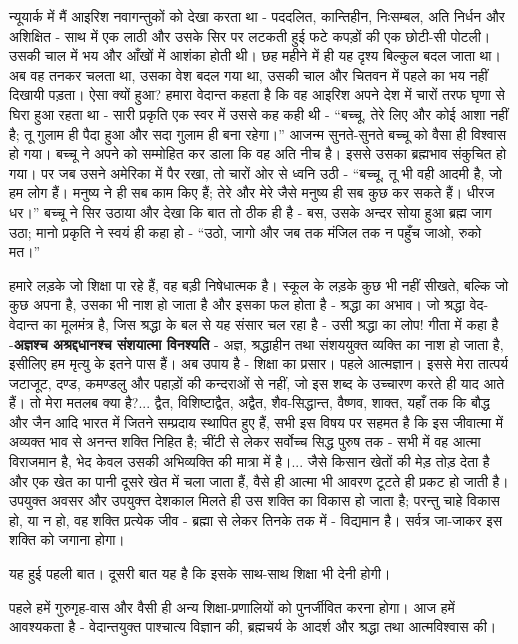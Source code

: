 न्यूयार्क में मैं आइरिश नवागन्तुकों को देखा करता था - पददलित, कान्तिहीन, निःसम्बल, अति निर्धन और अशिक्षित - साथ में एक लाठी और उसके सिर पर लटकती हुई फटे कपड़ों की एक छोटी-सी पोटली। उसकी चाल में भय और आँखों में आशंका होती थी। छह महीने में ही यह दृश्य बिल्कुल बदल जाता था। अब वह तनकर चलता था, उसका वेश बदल गया था, उसकी चाल और चितवन में पहले का भय नहीं दिखायी पड़ता। ऐसा क्यों हुआ? हमारा वेदान्त कहता है कि वह आइरिश अपने देश में चारों तरफ घृणा से घिरा हुआ रहता था - सारी प्रकृति एक स्वर में उससे कह कही थी - “बच्चू, तेरे लिए और कोई आशा नहीं है; तू गुलाम ही पैदा हुआ और सदा गुलाम ही बना रहेगा।” आजन्म सुनते-सुनते बच्चू को वैसा ही विश्वास हो गया। बच्चू ने अपने को सम्मोहित कर डाला कि वह अति नीच है। इससे उसका ब्रह्मभाव संकुचित हो गया। पर जब उसने अमेरिका में पैर रखा, तो चारों ओर से ध्वनि उठी - “बच्चू, तू भी वही आदमी है, जो हम लोग हैं। मनुष्य ने ही सब काम किए हैं; तेरे और मेरे जैसे मनुष्य ही सब कुछ कर सकते हैं। धीरज धर।” बच्चू ने सिर उठाया और देखा कि बात तो ठीक ही है - बस, उसके अन्दर सोया हुआ ब्रह्म जाग उठा; मानो प्रकृति ने स्वयं ही कहा हो - “उठो, जागो और जब तक मंजिल तक न पहुँच जाओ, रुको मत।” 

हमारे लड़के जो शिक्षा पा रहे हैं, वह बड़ी निषेधात्मक है। स्कूल के लड़के कुछ भी नहीं सीखते, बल्कि जो कुछ अपना है, उसका भी नाश हो जाता है और इसका फल होता है - श्रद्धा का अभाव। जो श्रद्धा वेद-वेदान्त का मूलमंत्र है, जिस श्रद्धा के बल से यह संसार चल रहा है - उसी श्रद्धा का लोप! गीता में कहा है -\textbf{अज्ञश्च अश्रद्दधानश्च संशयात्मा विनश्यति } - अज्ञ, श्रद्धाहीन तथा संशययुक्त व्यक्ति का नाश हो जाता है, इसीलिए हम मृत्यु के इतने पास हैं। अब उपाय है - शिक्षा का प्रसार। पहले आत्मज्ञान। इससे मेरा तात्पर्य जटाजूट, दण्ड, कमण्डलु और पहाड़ों की कन्दराओं से नहीं, जो इस शब्द के उच्चारण करते ही याद आते हैं। तो मेरा मतलब क्या है?... द्वैत, विशिष्टाद्वैत, अद्वैत, शैव-सिद्धान्त, वैष्णव, शाक्त, यहाँ तक कि बौद्ध और जैन आदि भारत में जितने सम्प्रदाय स्थापित हुए हैं, सभी इस विषय पर सहमत है कि इस जीवात्मा में अव्यक्त भाव से अनन्त शक्ति निहित है; चींटी से लेकर सर्वोच्च सिद्ध पुरुष तक - सभी में वह आत्मा विराजमान है, भेद केवल उसकी अभिव्यक्ति की मात्रा में है।... जैसे किसान खेतों की मेड़ तोड़ देता है और एक खेत का पानी दूसरे खेत में चला जाता हैं, वैसे ही आत्मा भी आवरण टूटते ही प्रकट हो जाती है। उपयुक्त अवसर और उपयुक्त्त देशकाल मिलते ही उस शक्ति का विकास हो जाता है; परन्तु चाहे विकास हो, या न हो, वह शक्ति प्रत्येक जीव - ब्रह्मा से लेकर तिनके तक में - विद्यमान है। सर्वत्र जा-जाकर इस शक्ति को जगाना होगा। 

यह हुई पहली बात। दूसरी बात यह है कि इसके साथ-साथ शिक्षा भी देनी होगी। 

पहले हमें गुरुगृह-वास और वैसी ही अन्य शिक्षा-प्रणालियों को पुनर्जीवित करना होगा। आज हमें आवश्यकता है - वेदान्तयुक्त पाश्चात्य विज्ञान की, ब्रह्मचर्य के आदर्श और श्रद्धा तथा आत्मविश्वास की। 


